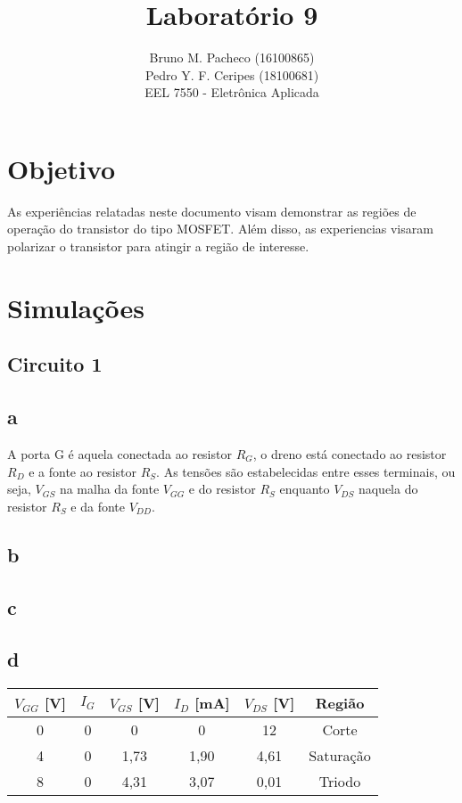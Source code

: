 \documentclass[a4paper]{report}
\begin{document}
 
\title{Laboratório 9}
\author{Bruno M. Pacheco (16100865)\\
Pedro Y. F. Ceripes (18100681) \\
EEL 7550 - Eletrônica Aplicada}

\maketitle
\section*{Objetivo}

As experiências relatadas neste documento visam demonstrar as regiões de operação do transistor do tipo MOSFET. Além disso, as experiencias visaram polarizar o transistor para atingir a região de interesse.

\section*{Simulações}

\subsection*{Circuito 1}
\subsection*{a}

A porta G é aquela conectada ao resistor $R_G$, o dreno está conectado ao resistor $R_D$ e a fonte ao resistor $R_S$. As tensões são estabelecidas entre esses terminais, ou seja, $V_{GS}$ na malha da fonte $V_{GG}$ e do resistor $R_S$ enquanto $V_{DS}$ naquela do resistor $R_S$ e da fonte $V_{DD}$.

\subsection*{b}
\subsection*{c}
\subsection*{d}

\begin{table}[H]
    \centering
    \begin{tabular}{c | c | c | c | c | c}
	$V_{GG}$ [V]  & $I_G$ & $V_{GS}$ [V]  & $I_D$ [mA]  & $V_{DS}$ [V]  & Região \\
    \hline
    0 & 0 & 0 & 0 & 12 & Corte \\
    4 & 0 & 1,73 & 1,90 & 4,61 & Saturação \\
    8 & 0 & 4,31 & 3,07 & 0,01 & Triodo
    \end{tabular}
\end{table}
\end{document}
